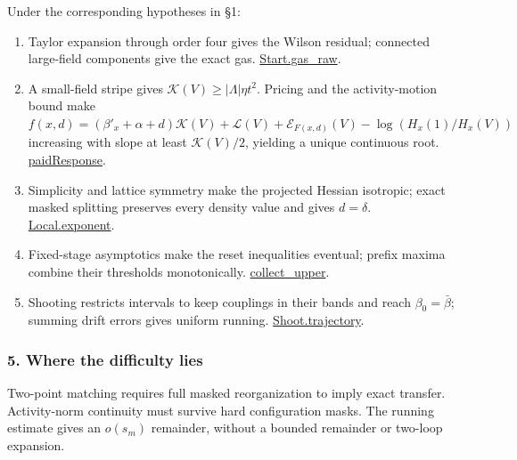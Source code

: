 \documentclass[
  letterpaper,
  11pt]{article}
\providecommand{\tightlist}{%
  \setlength{\itemsep}{0pt}\setlength{\parskip}{0pt}}
\begin{document}
Under the corresponding hypotheses in §1:

\begin{enumerate}
\def\labelenumi{\arabic{enumi}.}
\tightlist
\item
  Taylor expansion through order four gives the Wilson residual;
  connected large-field components give the exact gas.
  \href{https://github.com/yang-mills-group/OpenAI-YM-20261028/blob/3456e5e75cf8d4cd558955a5c7638fba2d68f464/YM/Extra/WILSON_STARTUP/Gas.lean\#L81-L94}{Start.gas\_raw}.
\item
  A small-field stripe gives \(\mathcal K(V)\ge|\Lambda|\eta t^2\).
  Pricing and the activity-motion bound make
  \(f(x,d)=(\beta'_x+\alpha+d)\mathcal K(V)+\mathcal L(V)+\mathcal E_{F(x,d)}(V)-\log(H_x(1)/H_x(V))\)
  increasing with slope at least \(\mathcal K(V)/2\), yielding a unique
  continuous root.
  \href{https://github.com/yang-mills-group/OpenAI-YM-20261028/blob/3456e5e75cf8d4cd558955a5c7638fba2d68f464/YM/UVNext/COUPLING_RESET/Advance.lean\#L121-L137}{paidResponse}.
\item
  Simplicity and lattice symmetry make the projected Hessian isotropic;
  exact masked splitting preserves every density value and gives
  \(d=\delta\).
  \href{https://github.com/yang-mills-group/OpenAI-YM-20261028/blob/3456e5e75cf8d4cd558955a5c7638fba2d68f464/YM/AnalyticBridge/VERIFIED_RESET_STEP/Evaluation.lean\#L70-L82}{Local.exponent}.
\item
  Fixed-stage asymptotics make the reset inequalities eventual; prefix
  maxima combine their thresholds monotonically.
  \href{https://github.com/yang-mills-group/OpenAI-YM-20261028/blob/3456e5e75cf8d4cd558955a5c7638fba2d68f464/YM/Push/PRICE_COMPILER/Basic.lean\#L111-L118}{collect\_upper}.
\item
  Shooting restricts intervals to keep couplings in their bands and
  reach \(\beta_0=\bar\beta\); summing drift errors gives uniform
  running.
  \href{https://github.com/yang-mills-group/OpenAI-YM-20261028/blob/3456e5e75cf8d4cd558955a5c7638fba2d68f464/YM/Shoot/Race.lean\#L23-L53}{Shoot.trajectory}.
\end{enumerate}

\subsubsection{5. Where the difficulty
lies}\label{where-the-difficulty-lies-11}

Two-point matching requires full masked reorganization to imply exact
transfer. Activity-norm continuity must survive hard configuration
masks. The running estimate gives an \(o(s_m)\) remainder, without a
bounded remainder or two-loop expansion.
\end{document}
